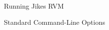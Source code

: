 \begin{section}{Running Jikes RVM}
\begin{subsection}{Standard Command-Line Options}
\end{subsection}


\end{section}